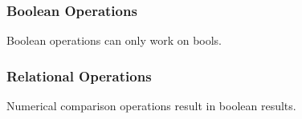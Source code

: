 \begin{prooftree}
\end{prooftree}

\begin{prooftree}
\end{prooftree}

\subsubsection{Boolean Operations}
\label{sec:types:rules:boolean}

Boolean operations can only work on bools.

\begin{prooftree}
\end{prooftree}

\begin{prooftree}
\end{prooftree}

\begin{prooftree}
\end{prooftree}

\subsubsection{Relational Operations}
\label{sec:types:rules:relation}

Numerical comparison operations result in boolean results.

\begin{prooftree}
\end{prooftree}

\begin{prooftree}
\end{prooftree}

